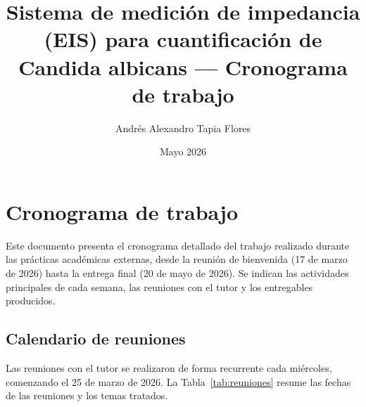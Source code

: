 \documentclass[11pt,a4paper,spanish]{book}
\title{Sistema de medici\'{o}n de impedancia (EIS) para cuantificaci\'{o}n de Candida albicans --- Cronograma de trabajo}
\author{Andr\'{e}s Alexandro Tapia Flores}
\date{Mayo 2026}
\begin{document}
\renewcommand{\listtablename}{\'{I}ndice de tablas}
\renewcommand{\contentsname}{\'{I}ndice de contenidos}
\renewcommand{\tablename}{Tabla}
\setlength{\headheight}{26pt}

\maketitle
\frontmatter
\tableofcontents

\mainmatter

\chapter{Cronograma de trabajo}

Este documento presenta el cronograma detallado del trabajo realizado durante las pr\'{a}cticas acad\'{e}micas externas, desde la reuni\'{o}n de bienvenida (17 de marzo de 2026) hasta la entrega final (20 de mayo de 2026). Se indican las actividades principales de cada semana, las reuniones con el tutor y los entregables producidos.

\section{Calendario de reuniones}

Las reuniones con el tutor se realizaron de forma recurrente cada mi\'{e}rcoles, comenzando el 25 de marzo de 2026. La Tabla~\ref{tab:reuniones} resume las fechas de las reuniones y los temas tratados.
\end{document}
